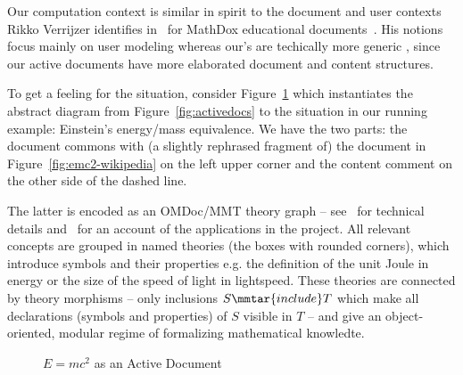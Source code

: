 Our computation context is similar in spirit to the document and user contexts Rikko
Verrijzer identifies in~\cite{Verrijzer:cimdpm15} for MathDox educational
documents~\cite{mathdox:on}. His notions focus mainly on user modeling whereas our's are
techically more generic , since our active documents have more elaborated document and
content structures.

To get a feeling for the situation, consider Figure~\ref{fig:emc-adp} which instantiates
the abstract diagram from Figure~\ref{fig:activedocs} to the situation in our running
example: Einstein's energy/mass equivalence. We have the two parts: the document commons
with (a slightly rephrased fragment of) the document in Figure~\ref{fig:emc2-wikipedia}
on the left upper corner and the content comment on the other side of the dashed line. 

The latter is encoded as an OMDoc/MMT theory graph -- see~\cite{RabKoh:WSMSML13} for
technical details and~\cite{DehKohKon:iop16,ODK-D6.2} for an account of the applications
in the \pn project. All relevant concepts are grouped in named theories (the boxes with
rounded corners), which introduce symbols and their properties e.g. the definition of the
unit Joule in \textsf{energy} or the size of the speed of light in
\textsf{lightspeed}. These theories are connected by theory morphisms -- only inclusions
$S\mmtar{include}T$ which make all declarations (symbols and properties) of $S$ visible in
$T$ -- and give an object-oriented, modular regime of formalizing mathematical knowledte.

\begin{figure}\centering
  {\footnotesize}
  \caption{$E=mc^2$ as an Active Document}\label{fig:emc-adp}
\end{figure}

